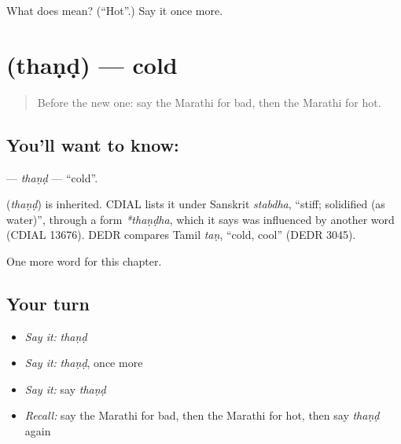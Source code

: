 \begin{tcolorbox}[breakable,colback=teal!4,colframe=teal!35!black,title={Before you move on}]
What does  mean? (\textquotedblleft{}Hot\textquotedblright{}.) Say it once more.
\end{tcolorbox}
\section[\texorpdfstring{\mr{थंड} (thaṇḍ)}{थंड (thaṇḍ)}]{ (thaṇḍ) — cold}

\label{lesson:MR-C104-thand}



\begin{quote}
Before the new one: say the Marathi for bad, then the Marathi for hot.
\end{quote}

\subsection*{You'll want to know: }
\textbf{} — \emph{thaṇḍ} — \textquotedblleft{}cold\textquotedblright{}.

\begin{cousinweb}
\textbf{} (\emph{thaṇḍ}) is inherited. CDIAL lists it under Sanskrit \emph{stabdha}, \textquotedblleft{}stiff; solidified (as water)\textquotedblright{}, through a form \emph{*thaṇḍha}, which it says was influenced by another word (CDIAL 13676). DEDR compares Tamil \emph{taṇ}, \textquotedblleft{}cold, cool\textquotedblright{} (DEDR 3045).
\end{cousinweb}

\begin{grammarlens}[title={What you've built}]
One more word for this chapter.
\end{grammarlens}

\subsection*{Your turn}
\begin{itemize}
\raggedright
  \item \emph{Say it:} \emph{thaṇḍ}
  \item \emph{Say it:} \emph{thaṇḍ}, once more
  \item \emph{Say it:} say \emph{thaṇḍ}
  \item \emph{Recall:} say the Marathi for bad, then the Marathi for hot, then say \emph{thaṇḍ} again
\end{itemize}

